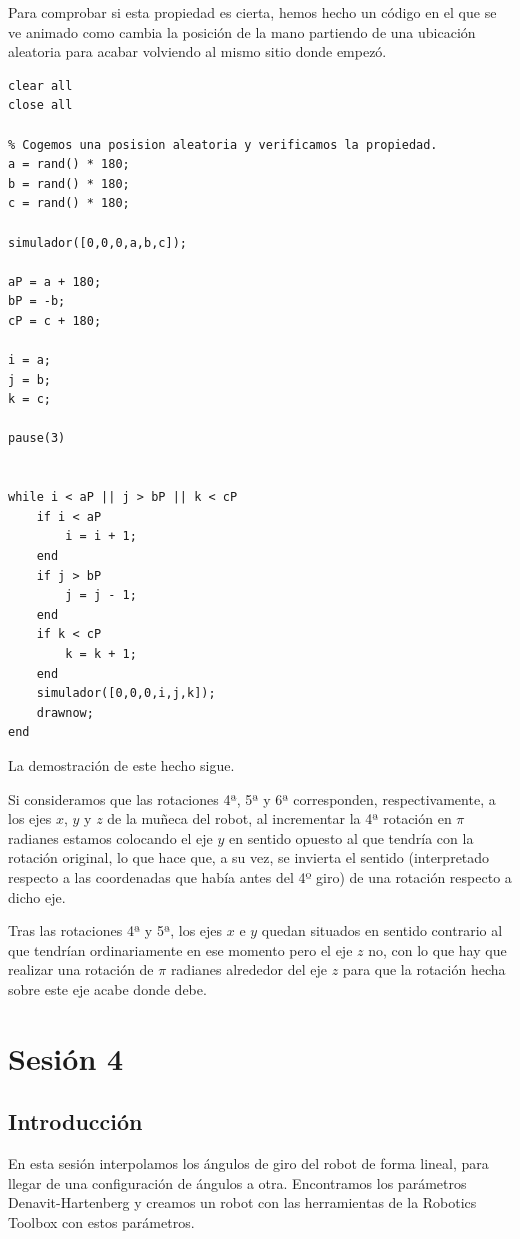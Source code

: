 \documentclass{article}
\let\oldsection\section
\renewcommand\section{\clearpage\oldsection}
\begin{document}
Para comprobar si esta propiedad es cierta, hemos hecho un código en el que se ve animado como cambia la posición de la mano partiendo de una ubicación aleatoria para acabar volviendo al mismo sitio donde empezó.

\begin{lstlisting}[frame=single]
clear all
close all

% Cogemos una posision aleatoria y verificamos la propiedad.
a = rand() * 180;
b = rand() * 180;
c = rand() * 180;

simulador([0,0,0,a,b,c]);

aP = a + 180;
bP = -b;
cP = c + 180;

i = a;
j = b;
k = c;

pause(3)
    

while i < aP || j > bP || k < cP
    if i < aP
        i = i + 1;
    end
    if j > bP
        j = j - 1;
    end
    if k < cP
        k = k + 1;
    end
    simulador([0,0,0,i,j,k]);
    drawnow;
end
\end{lstlisting}

La demostración de este hecho sigue.

Si consideramos que las rotaciones 4ª, 5ª y 6ª corresponden, respectivamente, a los ejes $x$, $y$ y $z$ de la muñeca del robot, al incrementar la 4ª rotación en $\pi$ radianes estamos colocando el eje $y$ en sentido opuesto al que tendría con la rotación original, lo que hace que, a su vez, se invierta el sentido (interpretado respecto a las coordenadas que había antes del 4º giro) de una rotación respecto a dicho eje.

Tras las rotaciones 4ª y 5ª, los ejes $x$ e $y$ quedan situados en sentido contrario al que tendrían ordinariamente en ese momento pero el eje $z$ no, con lo que hay que realizar una rotación de $\pi$ radianes alrededor del eje $z$ para que la rotación hecha sobre este eje acabe donde debe.

\section{Sesión 4}
\subsection{Introducción}
En esta sesión interpolamos los ángulos de giro del robot de forma lineal, para llegar de una configuración de ángulos a otra. Encontramos los parámetros Denavit-Hartenberg y creamos un robot con las herramientas de la Robotics Toolbox con estos parámetros.
\end{document}
